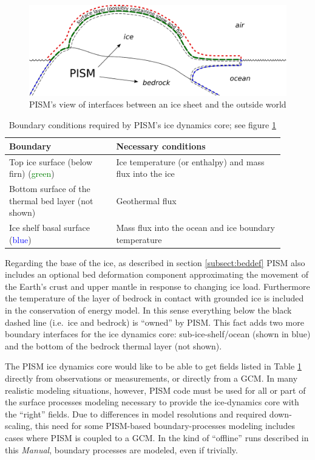 \documentclass[titlepage,letterpaper,final]{scrartcl}
\begin{document}
\begin{figure}
  \centering
  \includegraphics[width=6in]{figs/climate-cartoon.pdf}
  \caption{PISM's view of interfaces between an ice sheet and the outside world}
  \label{fig:climate-inputs}
\end{figure}

\begin{table}[h]
  \centering
  \begin{tabular}{p{0.35\linewidth}p{0.55\linewidth}}\\
    \hline
    \textbf{Boundary} & \textbf{Necessary conditions}\\
    \hline
    Top ice surface (below firn) (\textcolor{green}{green})& Ice temperature (or enthalpy) and mass flux into the ice\\
    Bottom surface of the thermal bed layer (not shown) & Geothermal flux\\
    Ice shelf basal surface (\textcolor{blue}{blue})& Mass flux into the ocean and ice boundary temperature\\
   \hline
  \end{tabular}
  \caption{Boundary conditions required by PISM's ice dynamics core; see figure
  \ref{fig:climate-inputs}}
  \label{tab:ice-dynamics-bc}
\end{table}

Regarding the base of the ice, as described in section \ref{subsect:beddef} PISM also includes an optional bed deformation component approximating the movement of the Earth's crust and upper mantle in response to changing ice load.   Furthermore the temperature of the layer of bedrock in contact with grounded ice is included in the conservation of energy model.  In this sense everything below the black dashed line (i.e.~ice and bedrock) is ``owned'' by PISM.  This fact adds two more boundary interfaces for the ice dynamics core: sub-ice-shelf/ocean (shown in blue) and the bottom of the bedrock thermal layer (not shown).

The PISM ice dynamics core would like to be able to get fields listed in Table
\ref{tab:ice-dynamics-bc} directly from observations or measurements, or directly from a GCM.  In many realistic modeling situations, however, PISM code must be used for all or part of the surface processes modeling necessary to provide the ice-dynamics core with the ``right'' fields.  Due to differences in model resolutions and required down-scaling, this need for some PISM-based boundary-processes modeling includes cases where PISM is coupled to a GCM.  In the kind of ``offline'' runs described in this \emph{Manual}, boundary processes are modeled, even if trivially.
\end{document}
